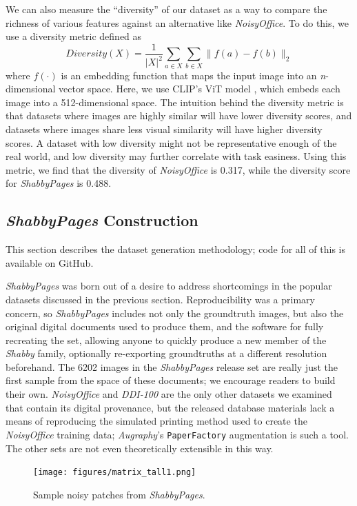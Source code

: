 \documentclass[runningheads]{llncs}
\begin{document}
We can also measure the ``diversity'' of our dataset as a way to compare the richness of various features against an alternative like \emph{NoisyOffice}.
To do this, we use a diversity metric \cite{larson-etal-2019-outlier} defined as
$$
Diversity(X) = \frac{1}{|X|^2} \sum_{a\in X} \sum_{b\in X} \|f(a)-f(b)\|_2
$$
where $f(\cdot)$ is an embedding function that maps the input image 
into an \emph{n}-dimensional vector space.
Here, we use CLIP's ViT model \cite{clip}, which embeds each image into a 512-dimensional space.
The intuition behind the diversity metric is that datasets where images are highly similar will have lower diversity scores, and datasets where images share less visual similarity will have higher diversity scores.
A dataset with low diversity might not be representative enough of the real world, and low diversity may further correlate with task easiness.
Using this metric, we find that the diversity of \emph{NoisyOffice} is 0.317, while the diversity score for \emph{ShabbyPages} is 0.488.


\subsection{\emph{ShabbyPages} Construction}
This section describes the dataset generation methodology; code for all of this is available on GitHub.

\emph{ShabbyPages} was born out of a desire to address shortcomings in the popular datasets discussed in the previous section.
Reproducibility was a primary concern, so \emph{ShabbyPages} includes not only the groundtruth images, but also the original digital documents used to produce them, and the software for fully recreating the set, allowing anyone to quickly produce a new member of the \emph{Shabby} family, optionally re-exporting groundtruths at a different resolution beforehand.
The 6202 images in the \emph{ShabbyPages} release set are really just the first sample from the space of these documents; we encourage readers to build their own.
\emph{NoisyOffice} and \emph{DDI-100} are the only other datasets we examined that contain its digital provenance, but the released database materials lack a means of reproducing the simulated printing method used to create the \emph{NoisyOffice} training data; \emph{Augraphy}'s \texttt{PaperFactory} augmentation is such a tool.
The other sets are not even theoretically extensible in this way.

\begin{figure}
    \texttt{[image: figures/matrix\_tall1.png]}
    \caption{Sample noisy patches from \emph{ShabbyPages}.}
    \label{fig:matrix_tall1}
\end{figure}
\end{document}
